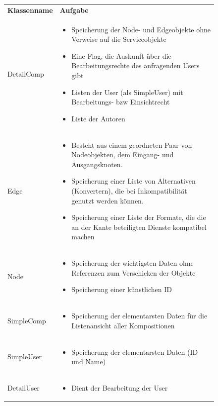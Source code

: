 \begin{figure}[h]
	\begin{tabularx}{\textwidth}{p{} | X}
		\rowcolor[HTML]{C0C0C0}
		\textbf{Klassenname} & \textbf{Aufgabe} \\
		DetailComp & \begin{itemize}
			\item Speicherung der Node- und Edgeobjekte ohne Verweise auf die Serviceobjekte
			\item Eine Flag, die Auskunft über die Bearbeitungsrechte des anfragenden Users gibt
			\item Listen der User (als SimpleUser) mit Bearbeitungs- bzw Einsichtrecht
			\item Liste der Autoren
		\end{itemize}\\
		\rowcolor[HTML]{E7E7E7}
		Edge & \begin{itemize}
		  \item Besteht aus einem geordneten Paar von Nodeobjekten, dem Eingang- und Ausgangsknoten.
			\item Speicherung einer Liste von Alternativen (Konvertern), die bei Inkompatibilität genutzt werden können.
			\item Speicherung einer Liste der Formate, die die an der Kante beteiligten Dienste kompatibel machen
		\end{itemize}\\
		Node & \begin{itemize}
			\item Speicherung der wichtigsten Daten ohne Referenzen zum Verschicken der Objekte
			\item Speicherung einer künstlichen ID
		\end{itemize}\\
		\rowcolor[HTML]{E7E7E7}
		SimpleComp & \begin{itemize}
			\item Speicherung der elementarsten Daten für die Listenansicht aller Kompositionen
		\end{itemize}\\
		SimpleUser  & \begin{itemize}
			\item Speicherung der elementarsten Daten (ID und Name)
		\end{itemize}\\
		\rowcolor[HTML]{E7E7E7}
		DetailUser & \begin{itemize}
			\item Dient der Bearbeitung der User

\end{itemize}
\end{tabularx}
\end{figure}
